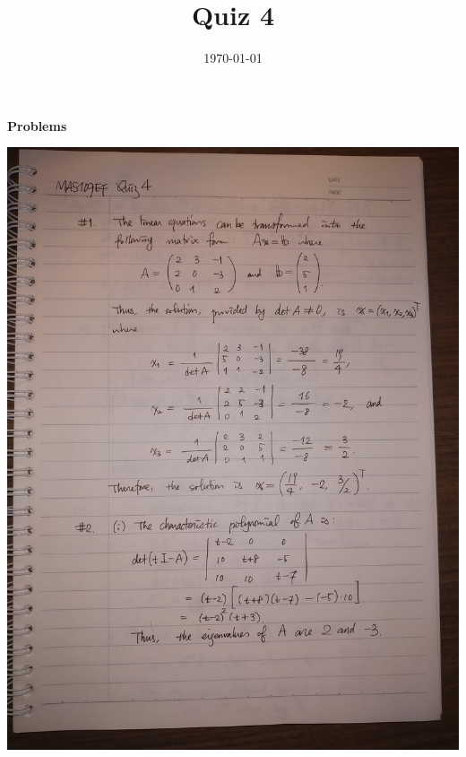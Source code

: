 \documentclass{homework}
\title{Quiz 4}
\date{\today}
\begin{document}
\maketitle
\setlength{\parindent}{0pt}
\vspace*{-0.8cm}
{\Large\bf Problems}

\includegraphics[width=\textwidth,origin=c]{prob1.jpg}
\newpage
\end{document}
